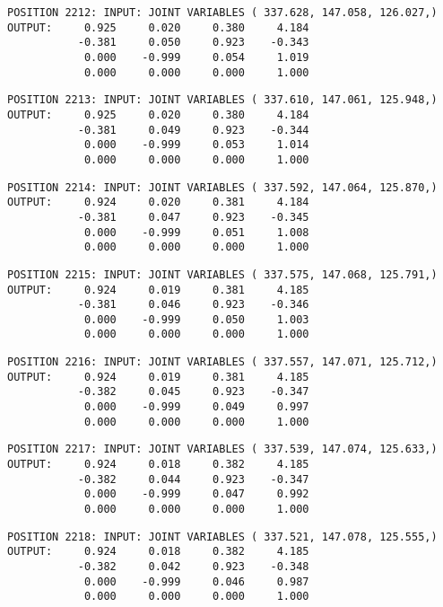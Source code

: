 \begin{verbatim}
POSITION 2212: INPUT: JOINT VARIABLES ( 337.628, 147.058, 126.027,)
OUTPUT:     0.925     0.020     0.380     4.184
           -0.381     0.050     0.923    -0.343
            0.000    -0.999     0.054     1.019
            0.000     0.000     0.000     1.000
\end{verbatim} \pagebreak[1]\begin{verbatim}
POSITION 2213: INPUT: JOINT VARIABLES ( 337.610, 147.061, 125.948,)
OUTPUT:     0.925     0.020     0.380     4.184
           -0.381     0.049     0.923    -0.344
            0.000    -0.999     0.053     1.014
            0.000     0.000     0.000     1.000
\end{verbatim} \pagebreak[1]\begin{verbatim}
POSITION 2214: INPUT: JOINT VARIABLES ( 337.592, 147.064, 125.870,)
OUTPUT:     0.924     0.020     0.381     4.184
           -0.381     0.047     0.923    -0.345
            0.000    -0.999     0.051     1.008
            0.000     0.000     0.000     1.000
\end{verbatim} \pagebreak[1]\begin{verbatim}
POSITION 2215: INPUT: JOINT VARIABLES ( 337.575, 147.068, 125.791,)
OUTPUT:     0.924     0.019     0.381     4.185
           -0.381     0.046     0.923    -0.346
            0.000    -0.999     0.050     1.003
            0.000     0.000     0.000     1.000
\end{verbatim} \pagebreak[1]\begin{verbatim}
POSITION 2216: INPUT: JOINT VARIABLES ( 337.557, 147.071, 125.712,)
OUTPUT:     0.924     0.019     0.381     4.185
           -0.382     0.045     0.923    -0.347
            0.000    -0.999     0.049     0.997
            0.000     0.000     0.000     1.000
\end{verbatim} \pagebreak[1]\begin{verbatim}
POSITION 2217: INPUT: JOINT VARIABLES ( 337.539, 147.074, 125.633,)
OUTPUT:     0.924     0.018     0.382     4.185
           -0.382     0.044     0.923    -0.347
            0.000    -0.999     0.047     0.992
            0.000     0.000     0.000     1.000
\end{verbatim} \pagebreak[1]\begin{verbatim}
POSITION 2218: INPUT: JOINT VARIABLES ( 337.521, 147.078, 125.555,)
OUTPUT:     0.924     0.018     0.382     4.185
           -0.382     0.042     0.923    -0.348
            0.000    -0.999     0.046     0.987
            0.000     0.000     0.000     1.000
\end{verbatim} \pagebreak[1]\begin{verbatim}

\end{verbatim}
